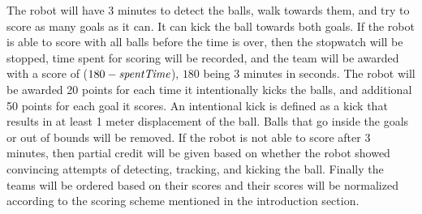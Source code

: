 \documentclass[12pt]{article}
\begin{document}
The robot will have 3 minutes to detect the balls, walk towards them, and try to score as many goals as it can. It can kick the ball towards both goals. If the robot is able to score with all balls before the time is over, then the stopwatch will be stopped, time spent for scoring will be recorded, and the team will be awarded with a score of ($180 - \emph{spentTime}$), $180$ being 3 minutes in seconds. The robot will be awarded 20 points for each time it intentionally kicks the balls, and additional 50 points for each goal it scores. An intentional kick is defined as a kick that results in at least 1 meter displacement of the ball. Balls that go inside the goals or out of bounds will be removed. If the robot is not able to score after 3 minutes, then partial credit will be given based on whether the robot showed convincing attempts of detecting, tracking, and kicking the ball. Finally the teams will be ordered based on their scores and their scores will be normalized according to the scoring scheme mentioned in the introduction section.
\end{document}
